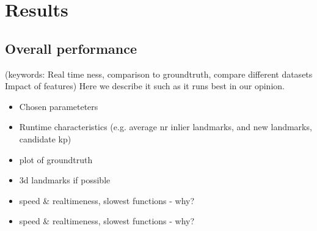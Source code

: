 \section{Results}

\subsection{Overall performance}
(keywords: Real time ness, comparison to groundtruth, compare different datasets
Impact of features) Here we describe it such as it runs best in our opinion.

\begin{itemize}
	\item Chosen parameteters
	\item Runtime characteristics (e.g. average nr inlier landmarks, and new landmarks, candidate kp)
	\item plot of groundtruth
	\item 3d landmarks if possible
	\item speed \& realtimeness, slowest functions - why?
	\item speed \& realtimeness, slowest functions - why?
\end{itemize}


